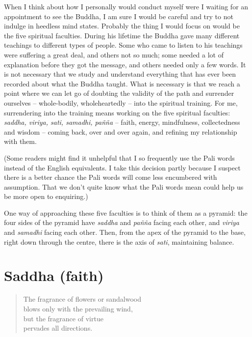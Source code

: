 When I think about how I personally would conduct myself were I waiting
for an appointment to see the Buddha, I am sure I would be careful and
try to not indulge in heedless mind states. Probably the thing I would
focus on would be the five spiritual faculties. During his lifetime the
Buddha gave many different teachings to different types of people. Some
who came to listen to his teachings were suffering a great deal, and
others not so much; some needed a lot of explanation before they got the
message, and others needed only a few words. It is not necessary that we
study and understand everything that has ever been recorded about what
the Buddha taught. What is necessary is that we reach a point where we
can let go of doubting the validity of the path and surrender ourselves
-- whole-bodily, wholeheartedly -- into the spiritual training. For me,
surrendering into the training means working on the five spiritual
faculties: \emph{saddha, viriya, sati, samadhi, pañña} -- faith, energy,
mindfulness, collectedness and wisdom -- coming back, over and over
again, and refining my relationship with them.

(Some readers might find it unhelpful that I so frequently use the Pali
words instead of the English equivalents. I take this decision partly
because I suspect there is a better chance the Pali words will come less
encumbered with assumption. That we don't quite know what the Pali words
mean could help us be more open to enquiring.)


One way of approaching these five faculties is to think of them as a
pyramid: the four sides of the pyramid have \emph{saddha} and \emph{pañña} facing
each other, and \emph{viriya} and \emph{samadhi} facing each other. Then, from the
apex of the pyramid to the base, right down through the centre, there is
the axis of \emph{sati}, maintaining balance.

\section{Saddha (faith)}

\begin{quote}
  The fragrance of flowers or sandalwood\\
  blows only with the prevailing wind,\\
  but the fragrance of virtue\\
  pervades all directions.
  
\end{quote}

